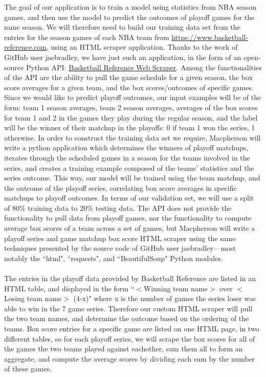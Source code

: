 \documentclass[letterpaper]{article} %
\begin{document}
The goal of our application is to train a model using statistics from NBA season games, and then use the model to predict the outcomes of playoff games for the same season. We will therefore need to build our training data set from the entries for the season games of each NBA team from \href{https://www.basketball-reference.com}{https://www.basketball-reference.com}, using an HTML scraper application. Thanks to the work of GitHub user jaebradley, we have just such an application, in the form of an open-source Python API: \href{https://github.com/jaebradley/basketball_reference_web_scraper}{Basketball Reference Web Scraper}. Among the functionalities of the API are the ability to pull the game schedule for a given season, the box score averages for a given team, and the box scores/outcomes of specific games. Since we would like to predict playoff outcomes, our input examples will be of the form: team 1 season averages, team 2 season averages, averages of the box scores for team 1 and 2 in the games they play during the regular season, and the label will be the winner of their matchup in the playoffs: 0 if team 1 won the series, 1 otherwise. In order to construct the training data set we require, Macpherson will write a python application which determines the winners of playoff matchups, iterates through the scheduled games in a season for the teams involved in the series, and creates a training example composed of the teams' statistics and the series outcome. This way, our model will be trained using the team matchup, and the outcome of the playoff series, correlating box score averages in specific matchups to playoff outcomes. In terms of our validation set, we will use a split of 80\% training data to 20\% testing data. The API does not provide the functionality to pull data from playoff games, nor the functionality to compute average box scores of a team across a set of games, but Macpherson will write a playoff series and game matchup box score HTML scraper using the same techniques presented by the source code of GitHub user jaebradley---most notably the ``html", ``requests", and ``BeautifulSoup" Python modules. \\ \\ 
The entries in the playoff data provided by Basketball Reference are listed in an HTML table, and displayed in the form ``$<$Winning team name$>$ over $<$Losing team name$>$ (4-x)" where x is the number of games the series loser was able to win in the 7 game series. Therefore our custom HTML scraper will pull the two team names, and determine the outcome based on the ordering of the teams. Box score entries for a specific game are listed on one HTML page, in two different tables, so for each playoff series, we will scrape the box scores for all of the games the two teams played against eachother, sum them all to form an aggregate, and compute the average scores by dividing each sum by the number of these games. \\ \\
\end{document}

